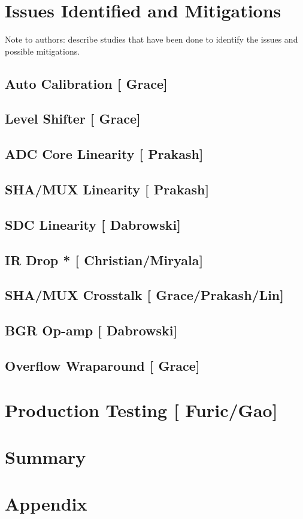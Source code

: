\documentclass[10pt]{article}
\begin{document}
\section{Issues Identified and Mitigations}
Note to authors: describe studies that have been done to identify the issues and possible mitigations.

\subsection{Auto Calibration [{\color{red} Grace}] }

\subsection{Level Shifter  [{\color{red} Grace}] }

\subsection{ADC Core Linearity  [{\color{red} Prakash}] }

\subsection{SHA/MUX Linearity  [{\color{red} Prakash}] }
\subsection{SDC Linearity  [{\color{red} Dabrowski}] }

\subsection{IR Drop * [{\color{red} Christian/Miryala}] }
\subsection{SHA/MUX Crosstalk [{\color{red} Grace/Prakash/Lin}] }

\subsection{BGR Op-amp	 [{\color{red} Dabrowski}] }

\subsection{Overflow Wraparound  [{\color{red} Grace}] }


\section{Production Testing   [{\color{red} Furic/Gao}] }


\section{Summary}  
%	

\newpage



\newpage
\section*{Appendix}

\end{document}
